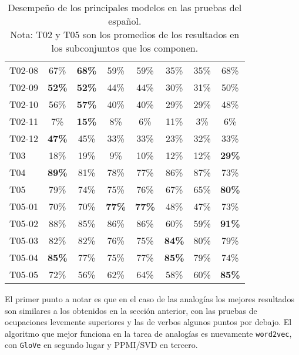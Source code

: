 \begin{table}[!h]
\begin{tabularx}{\textwidth}{Y*{7}{c}}
        T02-08 & 67\% & \textbf{68\%} & 59\% & 59\% & 35\% & 35\% & 68\%\\
        T02-09 & \textbf{52\%} & \textbf{52\%} & 44\% & 44\% & 30\% & 31\% & 50\%\\
        T02-10 & 56\% & \textbf{57\%} & 40\% & 40\% & 29\% & 29\% & 48\%\\
        T02-11 & 7\% & \textbf{15\%} & 8\% & 6\% & 11\% & 3\% & 6\%\\
        T02-12 & \textbf{47\%} & 45\% & 33\% & 33\% & 23\% & 32\% & 33\%\\
        T03 & 18\% & 19\% & 9\% & 10\% & 12\% & 12\% & \textbf{29\%}\\
        T04 & \textbf{89\%} & 81\% & 78\% & 77\% & 86\% & 87\% & 73\%\\
        T05 & 79\% & 74\% & 75\% & 76\% & 67\% & 65\% & \textbf{80\%}\\
        T05-01 & 70\% & 70\% & \textbf{77\%} & \textbf{77\%} & 48\% & 47\% & 73\%\\
        T05-02 & 88\% & 85\% & 86\% & 86\% & 60\% & 59\% & \textbf{91\%}\\
        T05-03 & 82\% & 82\% & 76\% & 75\% & \textbf{84\%} & 80\% & 79\%\\
        T05-04 & \textbf{85\%} & 77\% & 75\% & 77\% & \textbf{85\%} & 79\% & 74\%\\
        T05-05 & 72\% & 56\% & 62\% & 64\% & 58\% & 60\% & \textbf{85\%}\\
        \midrule
        \bottomrule
    \end{tabularx}
    \caption{Desempeño de los principales modelos en las pruebas del español.\\
    Nota: T02 y T05 son los promedios de los resultados en los subconjuntos que los componen.}
    \label{table:spanish_results}
\end{table}

El primer punto a notar es que en el caso de las analogías los mejores resultados son similares a
los obtenidos en la sección anterior, con las pruebas de ocupaciones levemente superiores y las de
verbos algunos puntos por debajo. El algoritmo que mejor funciona en la tarea de analogías es
nuevamente \texttt{word2vec}, con \texttt{GloVe} en segundo lugar y PPMI/SVD en tercero.

